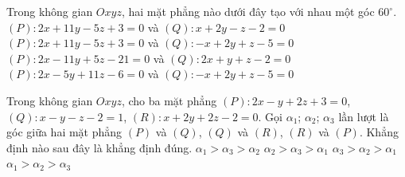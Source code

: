 \begin{ex}%
	Trong không gian $Oxyz$, hai mặt phẳng nào dưới đây tạo với nhau một góc $60^\circ$.
	\choice
	{$(P)\colon 2x+11y-5z+3=0$ và $(Q)\colon x+2y-z-2=0$}
	{\True $(P)\colon 2x+11y-5z+3=0$ và $(Q)\colon-x+2y+z-5=0$}
	{$(P)\colon 2x-11y+5z-21=0$ và $(Q)\colon 2x+y+z-2=0$}
	{$(P)\colon 2x-5y+11z-6=0$ và $(Q)\colon -x+2y+z-5=0$}
\end{ex}
\begin{ex}%
	Trong không gian $Oxyz$, cho ba mặt phẳng $(P)\colon 2x-y+2z+3=0$, $(Q)\colon x-y-z-2=1$, $(R)\colon x+2y+2z-2=0$. Gọi $\alpha _1$; $\alpha _2$; $\alpha _3$ lần lượt là góc giữa hai mặt phẳng $(P)$ và $(Q)$, $(Q)$ và $(R)$, $(R)$ và $(P)$. Khẳng định nào sau đây là khẳng định đúng.
	\choice
	{\True $\alpha _1>\alpha _3>\alpha _2$}
	{$\alpha _2>\alpha _3>\alpha _1$}
	{$\alpha _3>\alpha _2>\alpha _1$}
	{$\alpha _1>\alpha _2>\alpha _3$}
\end{ex}
